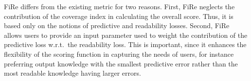 \documentclass{article}
\newcommand{\fire}{FiRe}
\begin{document}
\fire{} differs from the existing metric for two reasons.
%
First, \fire{} neglects the contribution of the coverage index in calculating the overall score.
%
Thus, it is based only on the notions of predictive and readability losses.
%
Second, \fire{} allows users to provide an input parameter used to weight the contribution of the predictive loss w.r.t.\ the readability loss.
%
This is important, since it enhances the flexibility of the scoring function in capturing the needs of users, for instance preferring output knowledge with the smallest predictive error rather than the most readable knowledge having larger errors.

%
%
\end{document}
